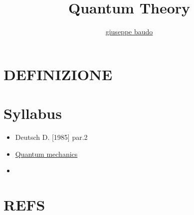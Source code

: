 \documentclass[a4paper,10pt]{article}
\title{Quantum Theory}
\author{\href{http://www.baudo.hol.es}{giuseppe baudo}}
\begin{document}
\maketitle

\section{DEFINIZIONE}

\section{Syllabus}
\begin{itemize}
 \item Deutsch D. [1985] par.2
 \item \href{QuantumMechanics.html}{Quantum mechanics}
 \item
\end{itemize}


\section{REFS}
\cite{9}

\end{document}
